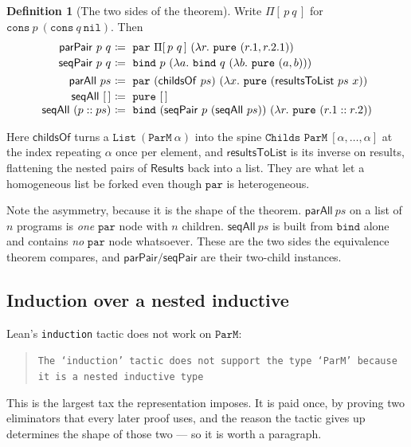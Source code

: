\documentclass[11pt,a4paper]{article}
\theoremstyle{definition}
\newtheorem{definition}{Definition}
\theoremstyle{plain}
\theoremstyle{remark}
\newcommand{\PM}{\texttt{ParM}}
\begin{document}
\begin{definition}[The two sides of the theorem]\label{def:combinators}
Write $\Pi[\,p\ q\,]$ for $\texttt{cons}\ p\ (\texttt{cons}\ q\ \texttt{nil})$. Then
\[
\begin{array}{r@{\ }l}
  \mathsf{parPair}\ p\ q &\coloneqq\ \texttt{par}\ \Pi[\,p\ q\,]\ (\lambda r.\ \texttt{pure}\ (r.1, r.2.1)) \\[2pt]
  \mathsf{seqPair}\ p\ q &\coloneqq\ \texttt{bind}\ p\ (\lambda a.\ \texttt{bind}\ q\ (\lambda b.\ \texttt{pure}\ (a,b))) \\[4pt]
  \mathsf{parAll}\ ps &\coloneqq\ \texttt{par}\ (\mathsf{childsOf}\ ps)\ (\lambda x.\ \texttt{pure}\ (\mathsf{resultsToList}\ ps\ x)) \\[2pt]
  \mathsf{seqAll}\ [\,] &\coloneqq\ \texttt{pure}\ [\,] \\
  \mathsf{seqAll}\ (p :: ps) &\coloneqq\ \texttt{bind}\ (\mathsf{seqPair}\ p\ (\mathsf{seqAll}\ ps))\ (\lambda r.\ \texttt{pure}\ (r.1 :: r.2))
\end{array}
\]
\end{definition}

Here $\mathsf{childsOf}$ turns a $\texttt{List}\ (\PM\ \alpha)$ into the spine
$\texttt{Childs ParM}\ [\alpha,\dots,\alpha]$ at the index repeating $\alpha$ once per
element, and $\mathsf{resultsToList}$ is its inverse on results, flattening the nested pairs
of $\mathsf{Results}$ back into a list. They are what let a homogeneous list be forked even
though $\texttt{par}$ is heterogeneous.

Note the asymmetry, because it is the shape of the theorem. $\mathsf{parAll}\ ps$ on a list
of $n$ programs is \emph{one} $\texttt{par}$ node with $n$ children. $\mathsf{seqAll}\ ps$ is
built from $\texttt{bind}$ alone and contains \emph{no} $\texttt{par}$ node whatsoever. These
are the two sides the equivalence theorem compares, and $\mathsf{parPair}/\mathsf{seqPair}$
are their two-child instances.

\subsection{Induction over a nested inductive}\label{sec:model:induction}

Lean's \texttt{induction} tactic does not work on $\PM$:
\begin{quote}\small
\texttt{The `induction' tactic does not support the type `ParM' because it is a nested
inductive type}
\end{quote}
This is the largest tax the representation imposes. It is paid once, by proving two
eliminators that every later proof uses, and the reason the tactic gives up determines the
shape of those two --- so it is worth a paragraph.
\end{document}
